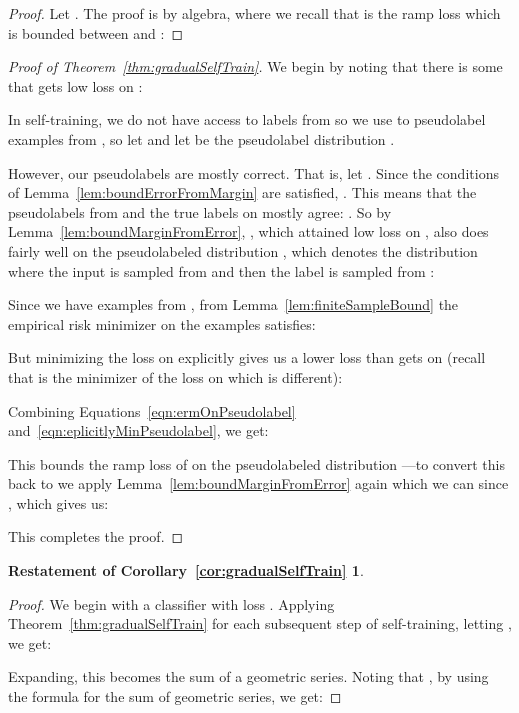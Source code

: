 \documentclass[11pt]{article}
\begin{document}
\begin{proof}
Let . The proof is by algebra, where we recall that  is the ramp loss which is bounded between  and :

\end{proof}


\begin{proof}[Proof of Theorem~\ref{thm:gradualSelfTrain}]
We begin by noting that there is some  that gets low loss  on :


In self-training, we do not have access to labels from  so we use  to pseudolabel examples  from , so let  and let  be the pseudolabel distribution .

However, our pseudolabels are mostly correct.
That is, let .
Since the conditions of Lemma~\ref{lem:boundErrorFromMargin} are satisfied, .
This means that the pseudolabels from  and the true labels on  mostly agree: .
So by Lemma~\ref{lem:boundMarginFromError}, , which attained low loss  on , also does fairly well on the pseudolabeled distribution , which denotes the distribution where the input  is sampled from  and then the label is sampled from :


Since we have  examples from , from Lemma~\ref{lem:finiteSampleBound} the empirical risk minimizer  on the  examples satisfies:


But minimizing the loss on  explicitly gives us a lower loss than  gets on  (recall that  is the minimizer of the loss on  which is different):


Combining Equations~\eqref{eqn:ermOnPseudolabel} and~\eqref{eqn:eplicitlyMinPseudolabel}, we get:

This bounds the ramp loss of  on the pseudolabeled distribution ---to convert this back to  we apply Lemma~\ref{lem:boundMarginFromError} again which we can since , which gives us:

This completes the proof.

\end{proof}



\newtheorem*{gradualSelfTrainCorollary}{Restatement of Corollary~\ref{cor:gradualSelfTrain}}

\begin{gradualSelfTrainCorollary}
\gradualSelfTrainCorollaryText{}
\end{gradualSelfTrainCorollary}

\begin{proof}
We begin with a classifier with loss .
Applying Theorem~\ref{thm:gradualSelfTrain} for each subsequent step of self-training, letting , we get:

Expanding, this becomes the sum of a geometric series. Noting that , by using the formula for the sum of geometric series, we get:

\end{proof}
\end{document}
